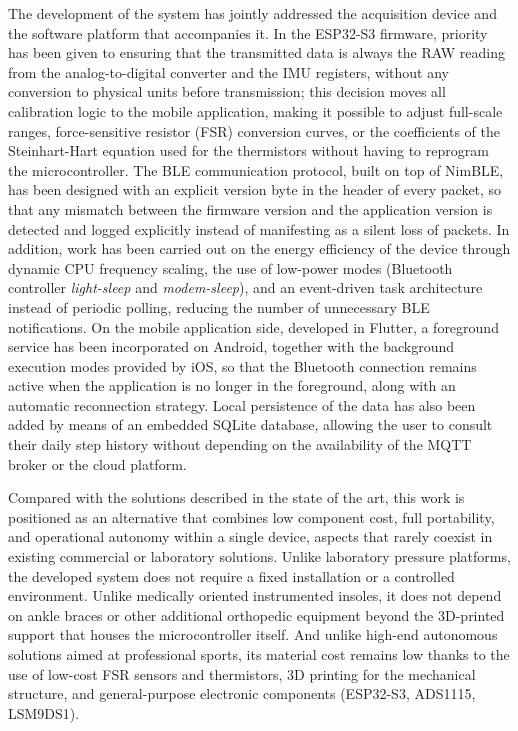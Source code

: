 \begin{IAtext}
The development of the system has jointly addressed the acquisition device and the software platform that accompanies it. In the ESP32-S3 firmware, priority has been given to ensuring that the transmitted data is always the RAW reading from the analog-to-digital converter and the IMU registers, without any conversion to physical units before transmission; this decision moves all calibration logic to the mobile application, making it possible to adjust full-scale ranges, force-sensitive resistor (FSR) conversion curves, or the coefficients of the Steinhart-Hart equation used for the thermistors without having to reprogram the microcontroller. The BLE communication protocol, built on top of NimBLE, has been designed with an explicit version byte in the header of every packet, so that any mismatch between the firmware version and the application version is detected and logged explicitly instead of manifesting as a silent loss of packets. In addition, work has been carried out on the energy efficiency of the device through dynamic CPU frequency scaling, the use of low-power modes (Bluetooth controller \textit{light-sleep} and \textit{modem-sleep}), and an event-driven task architecture instead of periodic polling, reducing the number of unnecessary BLE notifications. On the mobile application side, developed in Flutter, a foreground service has been incorporated on Android, together with the background execution modes provided by iOS, so that the Bluetooth connection remains active when the application is no longer in the foreground, along with an automatic reconnection strategy. Local persistence of the data has also been added by means of an embedded SQLite database, allowing the user to consult their daily step history without depending on the availability of the MQTT broker or the cloud platform.
\end{IAtext}

\begin{IAtext}
Compared with the solutions described in the state of the art, this work is positioned as an alternative that combines low component cost, full portability, and operational autonomy within a single device, aspects that rarely coexist in existing commercial or laboratory solutions. Unlike laboratory pressure platforms, the developed system does not require a fixed installation or a controlled environment. Unlike medically oriented instrumented insoles, it does not depend on ankle braces or other additional orthopedic equipment beyond the 3D-printed support that houses the microcontroller itself. And unlike high-end autonomous solutions aimed at professional sports, its material cost remains low thanks to the use of low-cost FSR sensors and thermistors, 3D printing for the mechanical structure, and general-purpose electronic components (ESP32-S3, ADS1115, LSM9DS1).
\end{IAtext}

